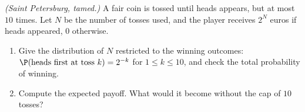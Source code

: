 \begin{exercise}[$\star\star\star$]\label{exo:tle:randvar:8}
\emph{(Saint Petersburg, tamed.)} A fair coin is tossed until heads
appears, but at most $10$ times. Let $N$ be the number of tosses used, and
the player receives $2^N$ euros if heads appeared, $0$ otherwise.
\begin{enumerate}
  \item Give the distribution of $N$ restricted to the winning outcomes:
        $\P(\text{heads first at toss } k) = 2^{-k}$ for
        $1 \leq k \leq 10$, and check the total probability of winning.
  \item Compute the expected payoff. What would it become without the cap
        of $10$ tosses?
\end{enumerate}
\end{exercise}
